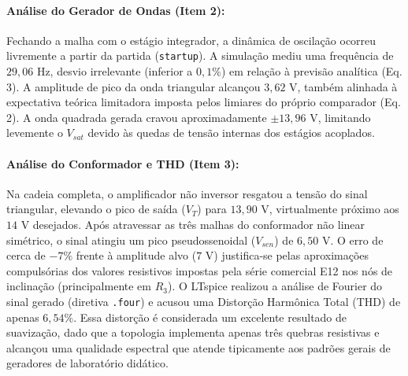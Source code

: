 \documentclass[11pt,a4paper]{article}
\begin{document}
\paragraph{Análise do Gerador de Ondas (Item 2):}
Fechando a malha com o estágio integrador, a dinâmica de oscilação ocorreu livremente a partir da partida (\texttt{startup}). A simulação mediu uma frequência de $29{,}06\text{ Hz}$, desvio irrelevante (inferior a $0{,}1\%$) em relação à previsão analítica (Eq. 3). A amplitude de pico da onda triangular alcançou $3{,}62\text{ V}$, também alinhada à expectativa teórica limitadora imposta pelos limiares do próprio comparador (Eq. 2). A onda quadrada gerada cravou aproximadamente $\pm13{,}96\text{ V}$, limitando levemente o $V_{sat}$ devido às quedas de tensão internas dos estágios acoplados.

\paragraph{Análise do Conformador e THD (Item 3):}
Na cadeia completa, o amplificador não inversor resgatou a tensão do sinal triangular, elevando o pico de saída ($V_T$) para $13{,}90\text{ V}$, virtualmente próximo aos $14\text{ V}$ desejados. 
Após atravessar as três malhas do conformador não linear simétrico, o sinal atingiu um pico pseudossenoidal ($V_{sen}$) de $6{,}50\text{ V}$. O erro de cerca de $-7\%$ frente à amplitude alvo ($7\text{ V}$) justifica-se pelas aproximações compulsórias dos valores resistivos impostas pela série comercial E12 nos nós de inclinação (principalmente em $R_3$). O LTspice realizou a análise de Fourier do sinal gerado (diretiva \texttt{.four}) e acusou uma Distorção Harmônica Total (THD) de apenas $6{,}54\%$. Essa distorção é considerada um excelente resultado de suavização, dado que a topologia implementa apenas três quebras resistivas e alcançou uma qualidade espectral que atende tipicamente aos padrões gerais de geradores de laboratório didático.
\end{document}
